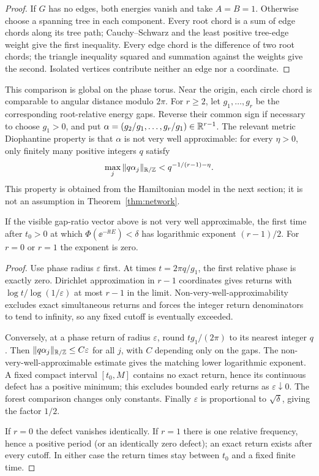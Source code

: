 \begin{proof}
If $G$ has no edges, both energies vanish and take $A=B=1$. Otherwise
choose a spanning tree in each component. Every root chord is a sum of
edge chords along its tree path; Cauchy--Schwarz and the least positive
tree-edge weight give the first inequality. Every edge chord is the
difference of two root chords; the triangle inequality squared and
summation against the weights give the second. Isolated vertices
contribute neither an edge nor a coordinate.
\end{proof}

This comparison is global on the phase torus. Near the origin, each
circle chord is comparable to angular distance modulo $2\pi$.
For $r\geq2$, let $g_1,\ldots,g_r$ be the corresponding root-relative
energy gaps. Reverse their common sign if necessary to choose $g_1>0$,
and put
$\alpha=(g_2/g_1,\ldots,g_r/g_1)\in\mathbb R^{r-1}$.
The relevant metric Diophantine property is that $\alpha$ is not
very well approximable: for every $\eta>0$, only finitely many positive
integers $q$ satisfy
\[
 \max_j\|q\alpha_j\|_{\mathbb R/\mathbb Z}<q^{-1/(r-1)-\eta}.
\]
This property is obtained from the Hamiltonian model in the next section;
it is not an assumption in Theorem~\ref{thm:network}.

\begin{lemma}\label{lem:clock}
If the visible gap-ratio vector above is not very well approximable,
the first time after $t_0>0$ at which $\Phi(\ee^{-\ii tE})<\delta$
has logarithmic exponent $(r-1)/2$.
For $r=0$ or $r=1$ the exponent is zero.
\end{lemma}

\begin{proof}
Use phase radius $\varepsilon$ first. At times
$t=2\pi q/g_1$, the first relative phase is exactly zero.
Dirichlet approximation in $r-1$ coordinates gives returns with
$\log t/\log(1/\varepsilon)$ at most $r-1$ in the limit.
Non-very-well-approximability excludes exact simultaneous returns and
forces the integer return denominators to tend to infinity, so any
fixed cutoff is eventually exceeded.

Conversely, at a phase return of radius $\varepsilon$, round
$tg_1/(2\pi)$ to its nearest integer $q$. Then
$\|q\alpha_j\|_{\mathbb R/\mathbb Z}\leq C\varepsilon$ for all $j$, with $C$ depending
only on the gaps. The non-very-well-approximable estimate gives the
matching lower logarithmic exponent. A fixed compact interval
$[t_0,M]$ contains no exact return, hence its continuous defect has a
positive minimum; this excludes bounded early returns as
$\varepsilon\downarrow0$. The forest comparison changes only constants.
Finally $\varepsilon$ is proportional to $\sqrt\delta$, giving the
factor $1/2$.

If $r=0$ the defect vanishes identically. If $r=1$ there is one relative
frequency, hence a positive period (or an identically zero defect);
an exact return exists after every cutoff. In either case the return
times stay between $t_0$ and a fixed finite time.
\end{proof}


